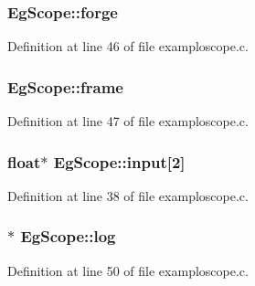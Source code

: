 \subsubsection[{\texorpdfstring{forge}{forge}}]{ Eg\+Scope\+::forge}\hypertarget{struct_eg_scope_a11b58dfd26f9473845bdec01ab5130d2}{}\label{struct_eg_scope_a11b58dfd26f9473845bdec01ab5130d2}


Definition at line 46 of file examploscope.\+c.

\subsubsection[{\texorpdfstring{frame}{frame}}]{ Eg\+Scope\+::frame}\hypertarget{struct_eg_scope_ab37671abca7974702ddfdd2b24540403}{}\label{struct_eg_scope_ab37671abca7974702ddfdd2b24540403}


Definition at line 47 of file examploscope.\+c.

\subsubsection[{\texorpdfstring{input}{input}}]{\setlength{\rightskip}{0pt plus 5cm}float$\ast$ Eg\+Scope\+::input\mbox{[}2\mbox{]}}\hypertarget{struct_eg_scope_ac1dc1a1be6ff4b3c41c9fc8ce0e396e8}{}\label{struct_eg_scope_ac1dc1a1be6ff4b3c41c9fc8ce0e396e8}


Definition at line 38 of file examploscope.\+c.

\subsubsection[{\texorpdfstring{log}{log}}]{$\ast$ Eg\+Scope\+::log}\hypertarget{struct_eg_scope_aa9b2382c35b2bf9aca3452f4f1759fce}{}\label{struct_eg_scope_aa9b2382c35b2bf9aca3452f4f1759fce}


Definition at line 50 of file examploscope.\+c.

